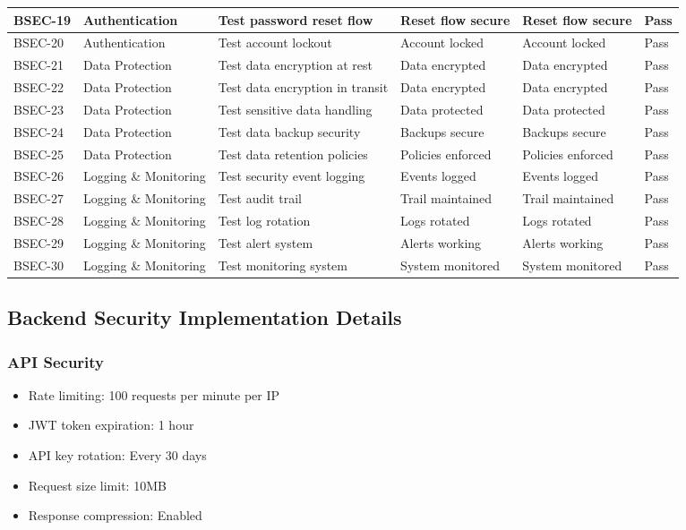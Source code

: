 {\begin{longtable}{|C{1.5cm}|C{2.5cm}|C{3.5cm}|C{2.5cm}|C{2.5cm}|C{1.5cm}|}
\hline
BSEC-19 & Authentication & Test password reset flow & Reset flow secure & Reset flow secure & Pass \\
\hline
BSEC-20 & Authentication & Test account lockout & Account locked & Account locked & Pass \\
\hline
BSEC-21 & Data Protection & Test data encryption at rest & Data encrypted & Data encrypted & Pass \\
\hline
BSEC-22 & Data Protection & Test data encryption in transit & Data encrypted & Data encrypted & Pass \\
\hline
BSEC-23 & Data Protection & Test sensitive data handling & Data protected & Data protected & Pass \\
\hline
BSEC-24 & Data Protection & Test data backup security & Backups secure & Backups secure & Pass \\
\hline
BSEC-25 & Data Protection & Test data retention policies & Policies enforced & Policies enforced & Pass \\
\hline
BSEC-26 & Logging \& Monitoring & Test security event logging & Events logged & Events logged & Pass \\
\hline
BSEC-27 & Logging \& Monitoring & Test audit trail & Trail maintained & Trail maintained & Pass \\
\hline
BSEC-28 & Logging \& Monitoring & Test log rotation & Logs rotated & Logs rotated & Pass \\
\hline
BSEC-29 & Logging \& Monitoring & Test alert system & Alerts working & Alerts working & Pass \\
\hline
BSEC-30 & Logging \& Monitoring & Test monitoring system & System monitored & System monitored & Pass \\
\hline
\end{longtable}
}

\subsection{Backend Security Implementation Details}

\subsubsection{API Security}
\begin{itemize}
    \item Rate limiting: 100 requests per minute per IP
    \item JWT token expiration: 1 hour
    \item API key rotation: Every 30 days
    \item Request size limit: 10MB
    \item Response compression: Enabled
\end{itemize}

